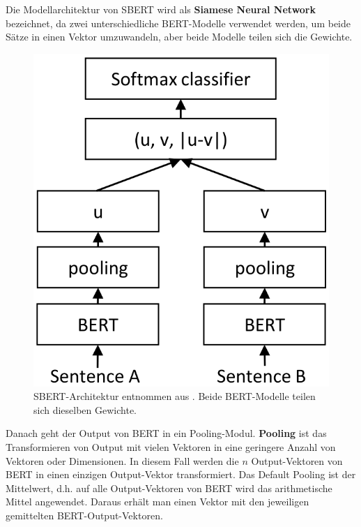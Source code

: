 \documentclass[12pt,letterpaper,ngerman]{article}
\begin{document}
Die Modellarchitektur von SBERT wird als {\bf Siamese Neural Network }
bezeichnet, da zwei unterschiedliche BERT-Modelle verwendet werden,
um beide Sätze in einen Vektor umzuwandeln, aber beide Modelle teilen 
sich die Gewichte.
\pagebreak

\begin{figure}[H]
  \begin{center}
    \includegraphics[scale=0.3]{abb/SBERT.png}
  \end{center}
  \caption{
    SBERT-Architektur entnommen aus \cite{reimers-2019-sentence-bert}. 
    Beide BERT-Modelle teilen sich dieselben Gewichte. 
  }
\end{figure}
Danach geht der Output von BERT in ein Pooling-Modul. 
{\bf Pooling} ist das Transformieren von Output mit vielen Vektoren 
in eine geringere Anzahl von Vektoren oder Dimensionen. In diesem Fall 
werden die $n$ Output-Vektoren von BERT in einen einzigen Output-Vektor 
transformiert. Das Default Pooling ist der Mittelwert, d.h. auf alle 
Output-Vektoren von BERT wird das arithmetische Mittel angewendet.
Daraus erhält man einen Vektor mit den jeweiligen gemittelten 
BERT-Output-Vektoren.
\end{document}
